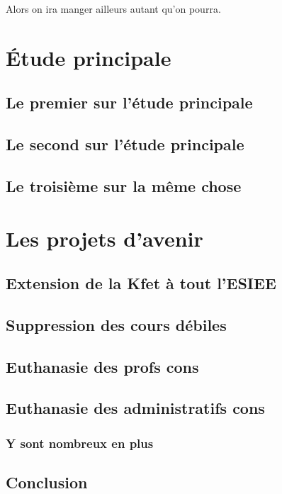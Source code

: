 \documentclass[french,12pt, a4paper,twoside,openright]{report}
\begin{document}
Alors on ira manger ailleurs autant qu'on pourra.

\part{\'Etude principale}

\chapter{Le premier sur l'\'etude principale}

\chapter{Le second sur l'\'etude principale}

\chapter{Le troisi\`eme sur la m\^eme chose}

\part{Les projets d'avenir}

\chapter{Extension de la Kfet \`a tout l'ESIEE}

\chapter{Suppression des cours d\'ebiles}

\chapter{Euthanasie des profs cons}

\chapter{Euthanasie des administratifs cons}

\section{Y sont nombreux en plus}

\chapter*{Conclusion}
\end{document}
